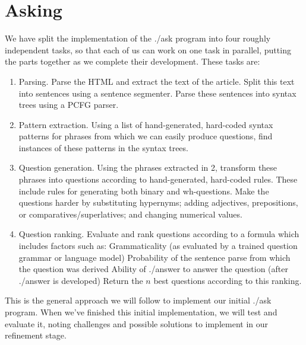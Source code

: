 \documentclass{article}
\begin{document}
\section{Asking}
We have split the implementation of the ./ask program into four roughly independent tasks, so that each of us can work on one task in parallel, putting the parts together as we complete their development. These tasks are:
\begin{enumerate}
  \item Parsing. Parse the HTML and extract the text of the article. Split this text into sentences using a sentence segmenter. Parse these sentences into syntax trees using a PCFG parser.
  \item Pattern extraction. Using a list of hand-generated, hard-coded syntax patterns for phrases from which we can easily produce questions, find instances of these patterns in the syntax trees.
  \item Question generation. Using the phrases extracted in 2, transform these phrases into questions according to hand-generated, hard-coded rules. These include rules for generating both binary and wh-questions. Make the questions harder by substituting hypernyms; adding adjectives, prepositions, or comparatives/superlatives; and changing numerical values.
  \item Question ranking. Evaluate and rank questions according to a formula which includes factors such as:
Grammaticality (as evaluated by a trained question grammar or language model)
Probability of the sentence parse from which the question was derived
Ability of ./answer to answer the question (after ./answer is developed)
Return the $n$ best questions according to this ranking.
\end{enumerate}
This is the general approach we will follow to implement our initial ./ask program. When we’ve finished this initial implementation, we will test and evaluate it, noting challenges and possible solutions to implement in our refinement stage.
\end{document}
